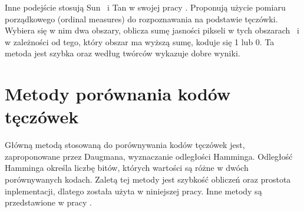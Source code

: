 Inne podejście stosują Sun ~i Tan w swojej pracy \cite{TaSu09}. Proponują użycie pomiaru porządkowego (ordinal measures) do rozpoznawania na podstawie tęczówki. Wybiera się w nim dwa obszary, oblicza sumę jasności pikseli w tych obszarach ~i w zależności od tego, który obszar ma wyższą sumę, koduje się 1 lub 0. Ta metoda jest szybka oraz według twórców wykazuje dobre wyniki.

\section{Metody porównania kodów tęczówek}
\label{sec:metodyPorownaniaKodow}
Główną metodą stosowaną do porównywania kodów tęczówek jest, zaproponowane przez Daugmana, wyznaczanie odległości Hamminga. Odległość Hamminga określa liczbę bitów, których wartości są różne w dwóch porównywanych kodach. Zaletą tej metody jest szybkość obliczeń oraz prostota inplementacji, dlatego została użyta w niniejszej pracy. Inne metody są przedstawione w pracy \cite{Gl11}.
